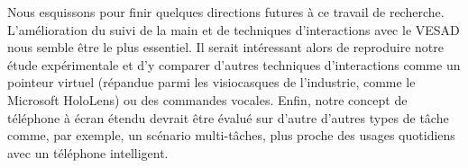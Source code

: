 Nous esquissons pour finir quelques directions futures à ce travail de recherche. L'amélioration du suivi de la main et de techniques d'interactions avec le VESAD nous semble être le plus essentiel. Il serait intéressant alors de reproduire notre étude expérimentale et d'y comparer d'autres techniques d'interactions comme un pointeur virtuel (répandue parmi les visiocasques de l'industrie, comme le Microsoft HoloLens) ou des commandes vocales. Enfin, notre concept de téléphone à écran étendu devrait être évalué sur d'autre d'autres types de tâche comme, par exemple, un scénario multi-tâches, plus proche des usages quotidiens avec un téléphone intelligent.